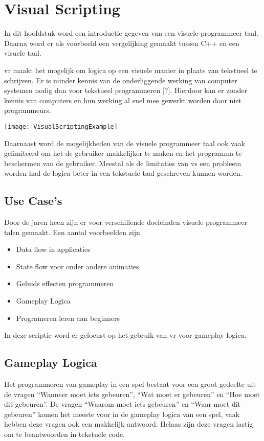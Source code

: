 \lstset {language=C++}

\chapter{Visual Scripting}
In dit hoofdstuk word een introductie gegeven van een visuele programmeer taal. Daarna word er als voorbeeld een vergelijking gemaakt tussen C++ en een visuele taal.

\gls{vr} maakt het mogelijk om logica op een visuele manier in plaats van tekstueel te schrijven. Er is minder kennis van de onderliggende werking van computer systemen nodig dan voor tekstueel programmeren [?]. Hierdoor kan er zonder kennis van computers en hun werking al snel mee gewerkt worden door niet programmeurs. 

\texttt{[image: VisualScriptingExample]}

Daarnaast word de mogelijkheden van de visuele programmeer taal ook vaak gelimiteerd om het de gebruiker makkelijker te maken en het programma te beschermen van de gebruiker. Meestal als de limitaties van \gls{vs} een probleem worden had de logica beter in een tekstuele taal geschreven kunnen worden.

\section{Use Case's}
Door de jaren heen zijn er voor verschillende doeleinden visuele programmeer talen gemaakt. 
Een aantal voorbeelden zijn

\begin{itemize}  
\item Data flow in applicaties 
\item State flow voor onder andere animaties 
\item Geluids effecten programmeren
\item Gameplay Logica 
\item Programeren leren aan beginners 
\end{itemize}

In deze scriptie word er gefocust op het gebruik van \gls{vr} voor gameplay logica.

\section{Gameplay Logica}
Het programmeren van gameplay in een spel bestaat voor een groot gedeelte uit de vragen “Wanneer moet iets gebeuren”, “Wat moet er gebeuren” en “Hoe moet dit gebeuren”.
De vragen “Waarom moet iets gebeuren” en “Waar moet dit gebeuren” komen het meeste voor in de gameplay logica van een spel, vaak hebben deze vragen ook een makkelijk antwoord. Helaas zijn deze vragen lastig om te beantwoorden in tekstuele code.

